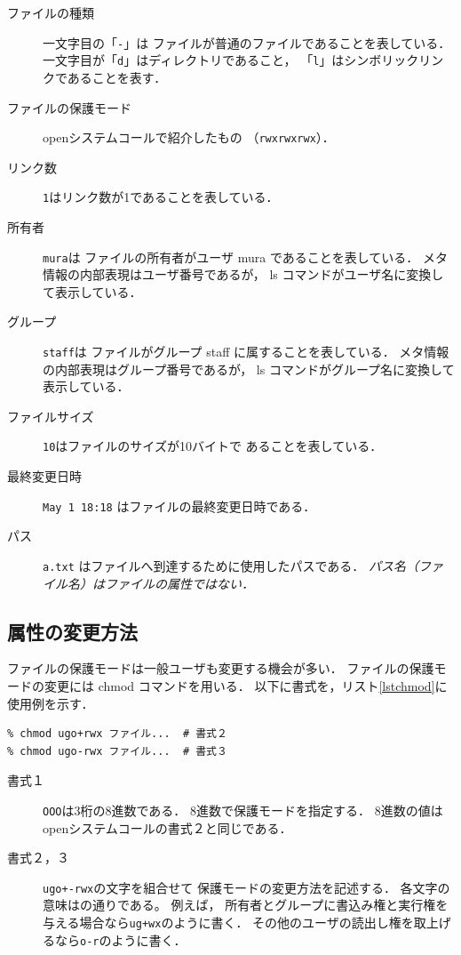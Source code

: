 \begin{description}
\item[ファイルの種類] 一文字目の「\texttt{-}」は
ファイルが普通のファイルであることを表している．
一文字目が「\texttt{d}」はディレクトリであること，
「\texttt{l}」はシンボリックリンクであることを表す．
\item[ファイルの保護モード] openシステムコールで紹介したもの
（\texttt{rwxrwxrwx}）．
\item[リンク数] \texttt{1}はリンク数が1であることを表している．
\item[所有者] \texttt{mura}は
ファイルの所有者がユーザ mura であることを表している．
メタ情報の内部表現はユーザ番号であるが，
ls コマンドがユーザ名に変換して表示している．
\item[グループ] \texttt{staff}は
ファイルがグループ staff に属することを表している．
メタ情報の内部表現はグループ番号であるが，
ls コマンドがグループ名に変換して表示している．
\item[ファイルサイズ] \texttt{10}はファイルのサイズが10バイトで
あることを表している．
\item[最終変更日時] \texttt{May 1 18:18} はファイルの最終変更日時である．
\item[パス] \texttt{a.txt} はファイルへ到達するために使用したパスである．
\emph{パス名（ファイル名）はファイルの属性ではない．}
\end{description}

\subsection{属性の変更方法}
ファイルの保護モードは一般ユーザも変更する機会が多い．
ファイルの保護モードの変更には chmod コマンドを用いる．
以下に書式を，リスト\ref{lstchmod}に使用例を示す．

\begin{lstlisting}[numbers=none]
% chmod OOO ファイル...      # 書式１
% chmod ugo+rwx ファイル...  # 書式２
% chmod ugo-rwx ファイル...  # 書式３
\end{lstlisting}

\begin{description}
\item[書式１] \texttt{OOO}は3桁の8進数である．
8進数で保護モードを指定する．
8進数の値はopenシステムコールの書式２と同じである．

\item[書式２，３] \texttt{ugo+-rwx}の文字を組合せて
保護モードの変更方法を記述する．
各文字の意味はの通りである。
例えば，
所有者とグループに書込み権と実行権を与える場合なら\texttt{ug+wx}のように書く．
その他のユーザの読出し権を取上げるなら\texttt{o-r}のように書く．
\end{description}

